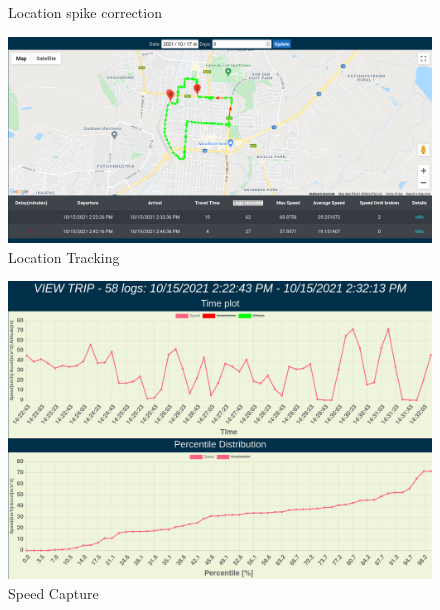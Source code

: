 \begin{figure}[H]
\centering
\caption{Location spike correction}
\label{fig:spike_correction}
\end{figure}

\begin{figure}
\centering
\includegraphics[width=6in]{eval_location.png}
\caption{Location Tracking}
\label{fig:eval_location}
\end{figure}

\begin{figure}
\centering
\includegraphics[width=5in]{eval_speed.png}
\caption{Speed Capture}
\label{fig:eval_speed}
\end{figure}

